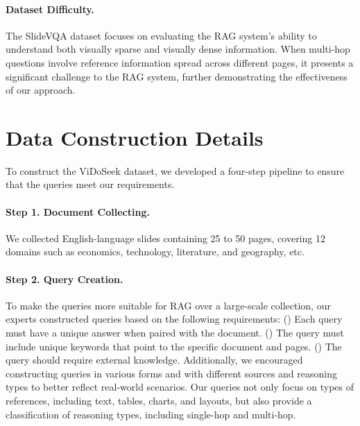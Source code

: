 
\paragraph{Dataset Difficulty.} The SlideVQA dataset focuses on evaluating the RAG system's ability to understand both visually sparse and visually dense information. When multi-hop questions involve reference information spread across different pages, it presents a significant challenge to the RAG system, further demonstrating the effectiveness of our approach.



\section{Data Construction Details}
\label{appendix:data_construction_pipeline}


To construct the ViDoSeek dataset, we developed a four-step pipeline to ensure that the queries meet our requirements. 
\paragraph{Step 1. Document Collecting.}
We collected English-language slides containing 25 to 50 pages, covering 12 domains such as economics, technology, literature, and geography, etc.

\paragraph{Step 2. Query Creation.}

To make the queries more suitable for RAG over a large-scale collection, our experts constructed queries based on the following requirements: () Each query must have a unique answer when paired with the document. () The query must include unique keywords that point to the specific document and pages. () The query should require external knowledge. Additionally, we encouraged constructing queries in various forms and with different sources and reasoning types to better reflect real-world scenarios. Our queries not only focus on types of references, including text, tables, charts, and layouts, but also provide a classification of reasoning types, including single-hop and multi-hop.

